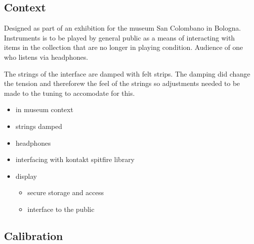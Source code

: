 


\subsection{Context}\label{context}

Designed as part of an exhibition for the museum San Colombano in
Bologna. Instruments is to be played by general public as a means of
interacting with items in the collection that are no longer in playing
condition. Audience of one who listens via headphones.

The strings of the interface are damped with felt strips. The damping
did change the tension and thereforew the feel of the strings so
adjustments needed to be made to the tuning to accomodate for this.

\begin{itemize}
\item
  in museum context
\item
  strings damped
\item
  headphones
\item
  interfacing with kontakt spitfire library
\item
  display

  \begin{itemize}
  \item
    secure storage and access
  \item
    interface to the public
  \end{itemize}
\end{itemize}

\subsection{Calibration}\label{calibration}


